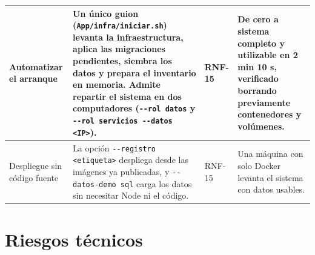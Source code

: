 \documentclass[11pt,a4paper]{article}
\begin{document}
\begin{center}
\begin{longtable}{|>{\raggedright\arraybackslash}p{2.9cm}|>{\raggedright\arraybackslash}p{5.1cm}|>{\raggedright\arraybackslash}p{1.7cm}|>{\raggedright\arraybackslash}p{3.7cm}|}
Automatizar el arranque &
Un único guion (\texttt{App/infra/iniciar.sh}) levanta la infraestructura, aplica las migraciones
pendientes, siembra los datos y prepara el inventario en memoria. Admite repartir el sistema en
dos computadores (\texttt{-{}-rol datos} y \texttt{-{}-rol servicios -{}-datos <IP>}). &
RNF-15 &
De cero a sistema completo y utilizable en \textbf{2 min 10 s}, verificado borrando previamente
contenedores y volúmenes.\\
\hline

Despliegue sin código fuente &
La opción \texttt{-{}-registro <etiqueta>} despliega desde las imágenes ya publicadas, y
\texttt{-{}-datos-demo sql} carga los datos sin necesitar Node ni el código. &
RNF-15 &
Una máquina con solo Docker levanta el sistema con datos usables.\\
\hline
\end{longtable}
\end{center}

\section{Riesgos técnicos}
\label{sec:riesgos}
\end{document}
